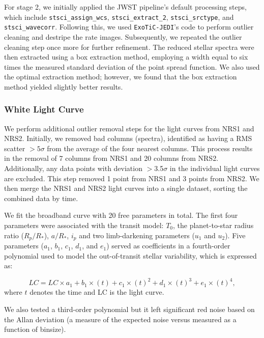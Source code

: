 \documentclass[twocolumn]{aastex63} %
\begin{document}
For stage 2, we initially applied the JWST pipeline's default processing steps, which include \texttt{stsci\_assign\_wcs}, \texttt{stsci\_extract\_2}, \texttt{stsci\_srctype}, and \texttt{stsci\_wavecorr}. Following this, we used \texttt{ExoTiC-JEDI}'s code to perform outlier cleaning and destripe the rate images. Subsequently, we repeated the outlier cleaning step once more for further refinement. The reduced stellar spectra were then extracted using a box extraction method, employing a width equal to six times the measured standard deviation of the point spread function. We also used the optimal extraction method; however, we found that the box extraction method yielded slightly better results. 

\subsubsection{White Light Curve}
We perform additional outlier removal steps for the light curves from NRS1 and NRS2. Initially, we removed bad columns (spectra), identified as having a RMS scatter $>5\sigma$ from the average of the four nearest columns. This process results in the removal of 7 columns from NRS1 and 20 columns from NRS2. Additionally, any data points with deviation $>$3.5$\sigma$ in the individual light curves are excluded. This step removed 1 point from NRS1 and 3 points from NRS2. We then merge the NRS1 and NRS2 light curves into a single dataset, sorting the combined data by time.

We fit the broadband curve with 20 free parameters in total. The first four parameters were associated with the transit model: $T_0$, the planet-to-star radius ratio ($R_{p}/R_{*}$), $a/R_{*}$, $i_p$ and two limb-darkening parameters ($u_{1}$ and $u_{2}$). Five parameters ($a_{1}$, $b_{1}$, $c_{1}$, $d_{1}$, and $e_{1}$) served as coefficients in a fourth-order polynomial used to model the out-of-transit stellar variability, which is expressed as: 

\begin{equation}\label{eqn:var}
    LC = LC \times a_{1} + b_{1}\times(t) + c_1 \times(t)^{2} + d_{1}\times(t)^{3} + e_1 \times(t)^{4},
\end{equation}
\noindent where $t$ denotes the time and LC is the light curve. 

We also tested a third-order polynomial but it left significant red noise based on the Allan deviation (a measure of the expected noise versus measured as a function of binsize). 
\end{document}
